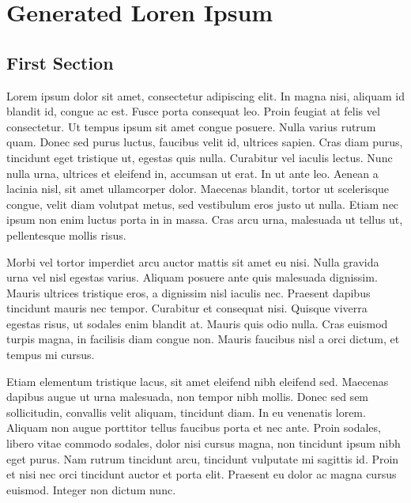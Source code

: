 
\chapter{Generated Loren Ipsum} %

\section{First Section} %

Lorem ipsum dolor sit amet, consectetur adipiscing elit. In magna nisi, aliquam id blandit id, congue ac est. Fusce porta consequat leo. Proin feugiat at felis vel consectetur. Ut tempus ipsum sit amet congue posuere. Nulla varius rutrum quam. Donec sed purus luctus, faucibus velit id, ultrices sapien. Cras diam purus, tincidunt eget tristique ut, egestas quis nulla. Curabitur vel iaculis lectus. Nunc nulla urna, ultrices et eleifend in, accumsan ut erat. In ut ante leo. Aenean a lacinia nisl, sit amet ullamcorper dolor. Maecenas blandit, tortor ut scelerisque congue, velit diam volutpat metus, sed vestibulum eros justo ut nulla. Etiam nec ipsum non enim luctus porta in in massa. Cras arcu urna, malesuada ut tellus ut, pellentesque mollis risus.

Morbi vel tortor imperdiet arcu auctor mattis sit amet eu nisi. Nulla gravida urna vel nisl egestas varius. Aliquam posuere ante quis malesuada dignissim. Mauris ultrices tristique eros, a dignissim nisl iaculis nec. Praesent dapibus tincidunt mauris nec tempor. Curabitur et consequat nisi. Quisque viverra egestas risus, ut sodales enim blandit at. Mauris quis odio nulla. Cras euismod turpis magna, in facilisis diam congue non. Mauris faucibus nisl a orci dictum, et tempus mi cursus.

Etiam elementum tristique lacus, sit amet eleifend nibh eleifend sed. Maecenas dapibus augue ut urna malesuada, non tempor nibh mollis. Donec sed sem sollicitudin, convallis velit aliquam, tincidunt diam. In eu venenatis lorem. Aliquam non augue porttitor tellus faucibus porta et nec ante. Proin sodales, libero vitae commodo sodales, dolor nisi cursus magna, non tincidunt ipsum nibh eget purus. Nam rutrum tincidunt arcu, tincidunt vulputate mi sagittis id. Proin et nisi nec orci tincidunt auctor et porta elit. Praesent eu dolor ac magna cursus euismod. Integer non dictum nunc.


